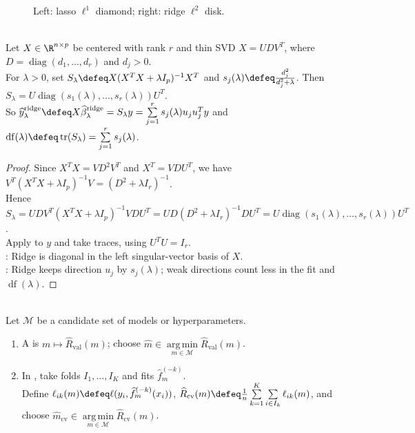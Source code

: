 \begin{figure}[H]
\centering

\caption{Left: lasso $\ell^1$ diamond; right: ridge $\ell^2$ disk.}
\label{fig:sl-ridge-lasso-constraint-geometry}
\end{figure}

\begin{proposition} \label{prop:sl-ridge-effective-degrees} \\
Let $X\in\R^{n\times p}$ be centered with rank $r$ and thin SVD $X=UDV^T$, where $D=\operatorname{diag}(d_1,\ldots,d_r)$ and $d_j>0$.\\
For $\lambda>0$, set $S_\lambda\defeq X(X^TX+\lambda I_p)^{-1}X^T$ and $s_j(\lambda)\defeq \frac{d_j^2}{d_j^2+\lambda}$. Then $S_\lambda=U\operatorname{diag}(s_1(\lambda),\ldots,s_r(\lambda))U^T$.\\
So $\widehat{y}^{\mathrm{ridge}}_\lambda\defeq X\widehat{\beta}^{\mathrm{ridge}}_\lambda=S_\lambda y=\sum\limits_{j=1}^r s_j(\lambda)u_ju_j^Ty$ and $\operatorname{df}(\lambda)\defeq\operatorname{tr}(S_\lambda)=\sum\limits_{j=1}^r s_j(\lambda)$.
\begin{proof} Since $X^TX=VD^2V^T$ and $X^T=VDU^T$, we have $V^T(X^TX+\lambda I_p)^{-1}V=(D^2+\lambda I_r)^{-1}$.\\
Hence $S_\lambda=UDV^T(X^TX+\lambda I_p)^{-1}VDU^T=UD(D^2+\lambda I_r)^{-1}DU^T=U\operatorname{diag}(s_1(\lambda),\ldots,s_r(\lambda))U^T$.\\
Apply to $y$ and take traces, using $U^TU=I_r$.\\
: Ridge is diagonal in the left singular-vector basis of $X$.\\
: Ridge keeps direction $u_j$ by $s_j(\lambda)$; weak directions count less in the fit and $\operatorname{df}(\lambda)$.
\end{proof}
\end{proposition}

\begin{definition} \label{def:sl-model-selection-validation} \\
Let $\mathcal{M}$ be a candidate set of models or hyperparameters.
\begin{enumerate}[label=(\roman*)]
\setlength{\itemsep}{0pt}
\item A  is $m\mapsto\widehat{R}_{\mathrm{val}}(m)$; choose $\widehat{m}\in\operatorname*{arg\,min}\limits_{m\in\mathcal{M}}\widehat{R}_{\mathrm{val}}(m)$.
\item In , take folds $I_1,\ldots,I_K$ and fits $\widehat{f}^{(-k)}_m$.\\
Define $\ell_{ik}(m)\defeq\ell(y_i,\widehat{f}^{(-k)}_m(x_i))$, $\widehat{R}_{\mathrm{cv}}(m)\defeq \frac{1}{n}\sum\limits_{k=1}^K\sum\limits_{i\in I_k}\ell_{ik}(m)$, and choose $\widehat{m}_{\mathrm{cv}}\in\operatorname*{arg\,min}\limits_{m\in\mathcal{M}}\widehat{R}_{\mathrm{cv}}(m)$.
\end{enumerate}
\end{definition}

